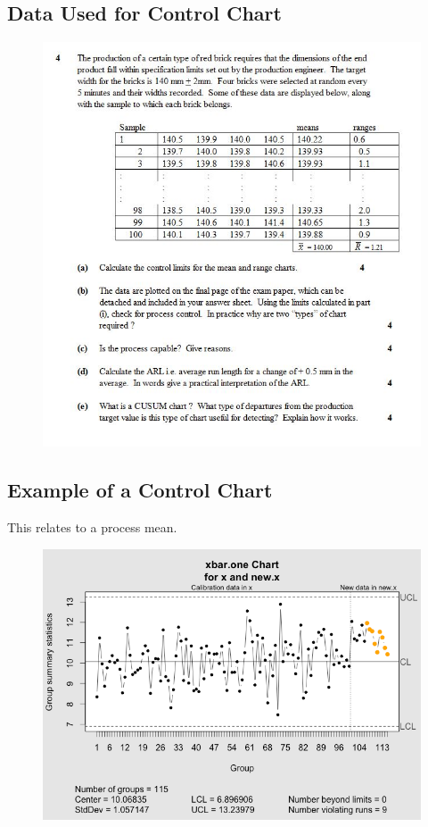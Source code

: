 \documentclass[]{report}
\begin{document}
{\subsection{Data Used for Control Chart}
\begin{figure}[h!]
\centering
\includegraphics[width=0.8\linewidth]{images/OldExamQuestion}
\end{figure}

\newpage
\subsection{Example of a Control Chart}
This relates to a process mean.
	\begin{figure}[h!]
		\centering
		\includegraphics[width=0.9\linewidth]{./qcc-yhatexample}
	\end{figure}
\newpage
}
\end{document}
